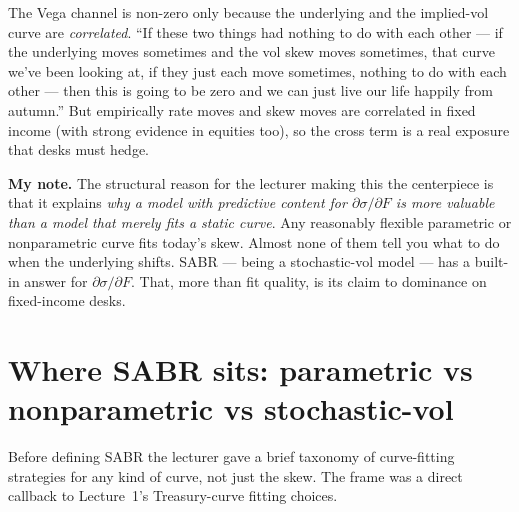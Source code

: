 The Vega channel is non-zero only because the underlying and the
implied-vol curve are \emph{correlated}. ``If these two things had
nothing to do with each other --- if the underlying moves sometimes
and the vol skew moves sometimes, that curve we've been looking at,
if they just each move sometimes, nothing to do with each other ---
then this is going to be zero and we can just live our life happily
from autumn.'' But empirically rate moves and skew moves are correlated
in fixed income (with strong evidence in equities too), so the cross
term is a real exposure that desks must hedge.

\begin{checkpoint}
\textbf{My note.} The structural reason for the lecturer making this
the centerpiece is that it explains \emph{why a model with predictive
content for $\partial \sigma / \partial F$ is more valuable than a
model that merely fits a static curve}. Any reasonably flexible
parametric or nonparametric curve fits today's skew. Almost none of
them tell you what to do when the underlying shifts. SABR --- being a
stochastic-vol model --- has a built-in answer for $\partial \sigma /
\partial F$. That, more than fit quality, is its claim to dominance
on fixed-income desks.
\end{checkpoint}

\section{Where SABR sits: parametric vs nonparametric vs stochastic-vol}\label{L7-sec:taxonomy}

Before defining SABR the lecturer gave a brief taxonomy of curve-fitting
strategies for any kind of curve, not just the skew. The frame was a
direct callback to Lecture~1's Treasury-curve fitting choices.

